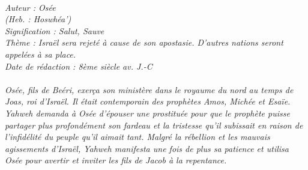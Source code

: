 \BFont
\noindent\hrulefill
{\footnotesize
\textit{
\bigskip
{\centering{}
\\Auteur : Osée
\\(Heb. : Hoswhéa')
\\Signification : Salut, Sauve
\\Thème : Israël sera rejeté à cause de son apostasie. D’autres nations seront appelées à sa place.
\\Date de rédaction : 8ème  siècle av. J.-C\\}
}
\textit{
\\Osée, fils de Beéri, exerça son ministère dans le royaume du nord au temps de Joas, roi d’Israël. Il était contemporain des prophètes Amos, Michée et Esaïe.
\\Yahweh demanda à Osée d’épouser une prostituée pour que le prophète puisse partager plus profondément son fardeau
et la tristesse qu’il subissait en raison de l’infidélité du peuple qu’il aimait tant. Malgré la rébellion et les mauvais
agissements d’Israël, Yahweh manifesta une fois de plus sa patience et utilisa Osée pour avertir et inviter les fils de Jacob à la repentance.\bigskip
}
}
\par\nobreak\noindent\hrulefill

